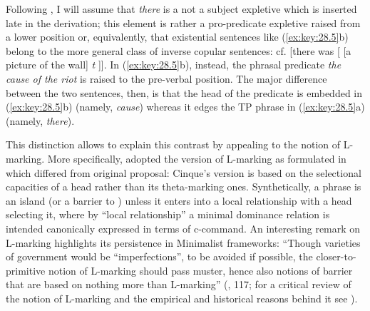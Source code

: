 \documentclass[output=paper]{langsci/langscibook}
\begin{document}
\ea%
    \label{ex:key:28.5}
	\z
\z

Following \textcite{Moro1988,Moro1997}, I will assume that \emph{there} is a
not a subject expletive which is inserted late in the derivation; this element
is rather a pro-predicate expletive raised from a lower position or,
equivalently, that existential sentences like (\ref{ex:key:28.5}b) belong to the
more general class of inverse copular sentences: cf. [there was [ [a picture of
the wall] \emph{t} ]]. In (\ref{ex:key:28.5}b), instead, the phrasal predicate
\emph{the cause of the riot} is raised to the pre-verbal position. The major
difference between the two sentences, then, is that the head of the predicate
is embedded in (\ref{ex:key:28.5}b) (namely, \emph{cause}) whereas it edges the TP
phrase in (\ref{ex:key:28.5}a) (namely, \emph{there}).

This distinction allows to explain this contrast by appealing to the notion of
L-marking. More specifically, \citet{Moro1997} adopted the version of L-marking
as formulated in \citet{Cinque1990} which differed from 
original proposal: Cinque's version is based on the selectional capacities of a
head rather than its theta-marking ones. Synthetically, a phrase is an
island
(or a barrier to ) unless it enters into a local relationship with a
head selecting it, where by “local relationship” a minimal dominance relation
is intended canonically expressed in terms of c-command. An interesting remark
on L-marking highlights its persistence in Minimalist frameworks: “Though
varieties of government would be \enquote{imperfections}, to be avoided if possible,
the closer-to-primitive notion of L-marking should pass muster, hence also
notions of barrier that are based on nothing more than L-marking”
(\citealt{Chomsky2000}, 117; for a critical review of the notion of L-marking
and the empirical and historical reasons behind it see \citealt{Roberts1988}).
\end{document}
